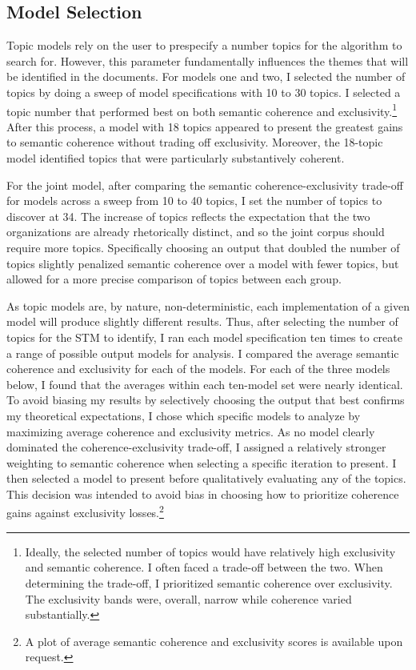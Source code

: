 \subsection{Model Selection}
Topic models rely on the user to prespecify a number topics for the
algorithm to search for. However, this parameter fundamentally influences the themes that will be
identified in the documents.  For models one and two, I selected the number of topics by doing a
sweep of model specifications with 10 to 30 topics. I selected a
topic number that performed best on both semantic coherence and
exclusivity.\footnote{Ideally, the selected number of topics would
  have relatively high exclusivity and semantic coherence. I often
  faced a trade-off between the two. When determining the trade-off, I
  prioritized semantic coherence over exclusivity. The exclusivity bands were, overall, narrow while
coherence varied substantially.} After this process, a model with 18 topics
appeared to present the greatest gains to semantic coherence without
trading off exclusivity. Moreover, the 18-topic model identified
topics that were particularly substantively coherent. 

For the joint model, after comparing the semantic
coherence-exclusivity trade-off for models across a sweep from 10
to 40 topics, I set the number of topics to discover at
34. The increase of topics reflects the expectation that the two
organizations are already rhetorically distinct, and so the joint
corpus should require more topics. Specifically choosing an output
that doubled the number of topics slightly penalized semantic
coherence over a model with fewer topics, but allowed for a more
precise comparison of topics between each group. 

As topic models are, by nature, non-deterministic, each
implementation of a given model will produce slightly different
results. Thus, after selecting the number of topics for the STM to
identify, I ran each model specification ten times to create a range of
possible output models for analysis. I compared the average
semantic coherence and exclusivity for each of the models. For each of
the three models below, I found that the averages within each
ten-model set were nearly identical. To avoid biasing my results by
selectively choosing the output that best confirms my theoretical expectations, I chose
which specific models to analyze by maximizing average coherence
and exclusivity metrics. As no model clearly dominated the
coherence-exclusivity trade-off, I assigned a relatively stronger
weighting to semantic coherence when selecting a specific iteration to
present. I then selected a model to present before qualitatively evaluating any of the topics. This
decision was intended to avoid bias in choosing how to prioritize
coherence gains against exclusivity losses.\footnote{A plot of average
semantic coherence and exclusivity scores is available upon request.} 
 
